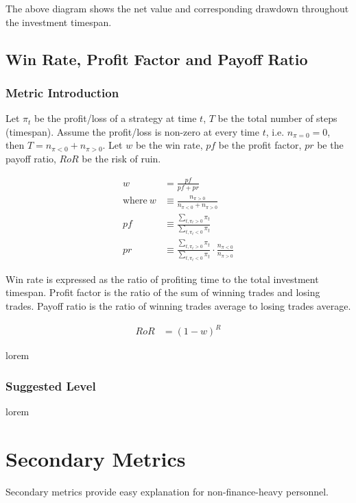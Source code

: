 \documentclass[12pt]{article}
\begin{document}
The above diagram shows the net value and corresponding drawdown throughout the investment timespan.

\subsection{Win Rate, Profit Factor and Payoff Ratio}

\subsubsection*{Metric Introduction}

Let \(\pi_t\) be the profit/loss of a strategy at time \(t\), \(T\) be the total number of steps (timespan). Assume the profit/loss is non-zero at every time \(t\), i.e. \(n_{\pi=0} = 0\), then \(T = n_{\pi<0} + n_{\pi>0}\). Let \(w\) be the win rate, \(pf\) be the profit factor, \(pr\) be the payoff ratio, \(RoR\) be the risk of ruin.

\begin{align*}
  w &= \frac{pf}{pf+pr} \\
  \text{where}~w &\equiv \frac{n_{\pi>0}}{n_{\pi<0} + n_{\pi>0}} \\
  pf &\equiv \frac{\sum_{t, \pi_t>0} \pi_t}{\sum_{t, \pi_t<0} \pi_t} \\
  pr &\equiv \frac{\sum_{t, \pi_t>0} \pi_t}{\sum_{t, \pi_t<0} \pi_t} \cdot \frac{n_{\pi<0}}{n_{\pi>0}}
\end{align*}

Win rate is expressed as the ratio of profiting time to the total investment timespan. Profit factor is the ratio of the sum of winning trades and losing trades. Payoff ratio is the ratio of winning trades average to losing trades average.

\begin{align*}
  RoR &= (1-w)^R
\end{align*}

lorem

\subsubsection*{Suggested Level}

lorem

\section{Secondary Metrics}

Secondary metrics provide easy explanation for non-finance-heavy personnel.
\end{document}
